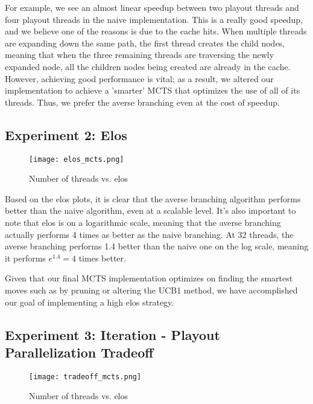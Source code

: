 \documentclass[11pt]{article}
\begin{document}
For example, we see an almost linear speedup between two playout threads and four playout threads in the naive implementation. This is a really good speedup, and we believe one of the reasons is due to the cache hits. When multiple threads are expanding down the same path, the first thread creates the child nodes, meaning that when the three remaining threads are traversing the newly expanded node, all the children nodes being created are already in the cache. However, achieving good performance is vital; as a result, we altered our implementation to achieve a 'smarter' MCTS that optimizes the use of all of its threads. Thus, we prefer the averse branching even at the cost of speedup. 

\subsection*{Experiment 2: Elos}

\begin{figure}[ht!]
\begin{center}
\texttt{[image: elos\_mcts.png]}
\caption{Number of threads vs. elos}
\end{center}
\end{figure}

Based on the elos plots, it is clear that the averse branching algorithm performs better than the naive algorithm, even at a scalable level. It's also important to note that elos is on a logarithmic scale, meaning that the averse branching actually performs 4 times as better as the naive branching. At 32 threads, the averse branching performs 1.4 better than the naive one on the log scale, meaning it performs $e^1.4 = 4$ times better. 

Given that our final MCTS implementation optimizes on finding the smartest moves such as by pruning or altering the UCB1 method, we have accomplished our goal of implementing a high elos strategy. 

\subsection*{Experiment 3: Iteration - Playout Parallelization Tradeoff}

\begin{figure}[ht!]
\begin{center}
\texttt{[image: tradeoff\_mcts.png]}
\caption{Number of threads vs. elos}
\end{center}
\end{figure}
\end{document}
